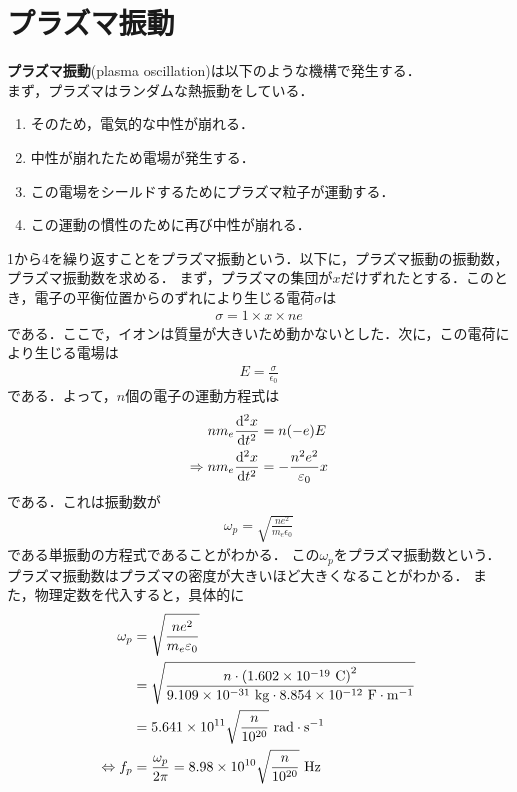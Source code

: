 \documentclass{report}
\begin{document}
  \section{プラズマ振動}
    \textbf{プラズマ振動}(plasma oscillation)は以下のような機構で発生する．\\
    まず，プラズマはランダムな熱振動をしている．
    \begin{enumerate}
      \item そのため，電気的な中性が崩れる．
      \item 中性が崩れたため電場が発生する．
      \item この電場をシールドするためにプラズマ粒子が運動する．
      \item この運動の慣性のために再び中性が崩れる．
    \end{enumerate}
    1から4を繰り返すことをプラズマ振動という．以下に，プラズマ振動の振動数，プラズマ振動数を求める．
    まず，プラズマの集団が$x$だけずれたとする．このとき，電子の平衡位置からのずれにより生じる電荷$\sigma$は
    \begin{align}
      \sigma = 1 \times x \times ne
    \end{align}
    である．ここで，イオンは質量が大きいため動かないとした．次に，この電荷により生じる電場は
    \begin{align}
      E = \frac{\sigma}{\epsilon_0}
    \end{align}
    である．よって，$n$個の電子の運動方程式は
    \begin{align}
      nm_e\dv[2]{x}{t} &= n(-e)E\\
      \Rightarrow nm_e \dv[2]{x}{t} &= -\frac{n^2e^2}{\varepsilon_0}x \label{plasma-oscillation}
    \end{align}
    である．これは振動数が
    \begin{align}
      \omega_p = \sqrt{\frac{ne^2}{m_e\epsilon_0}}
    \end{align}
    である単振動の方程式であることがわかる．
    この$\omega_p$をプラズマ振動数という．
    プラズマ振動数はプラズマの密度が大きいほど大きくなることがわかる．
    また，物理定数を代入すると，具体的に
    \begin{align}
      \omega_p &= \sqrt{\frac{ne^2}{m_e\epsilon_0}} \\ 
      &= \sqrt{\frac{n\cdot \qty(1.602\times 10^{-19}\ \r{C})^2}{9.109\times 10^{-31}\ \r{kg} \cdot 8.854\times 10^{-12}\ \r{F\cdot m^{-1}}}} \\ 
      &= 5.641 \times 10^{11} \sqrt{\frac{n}{10^{20}}} \ \r{rad\cdot s^{-1}} \\ 
      \Leftrightarrow f_p &= \frac{\omega_p}{2\pi} = 8.98 \times 10^{10} \sqrt{\frac{n}{10^{20}}} \ \text{Hz}
    \end{align}
\end{document}
